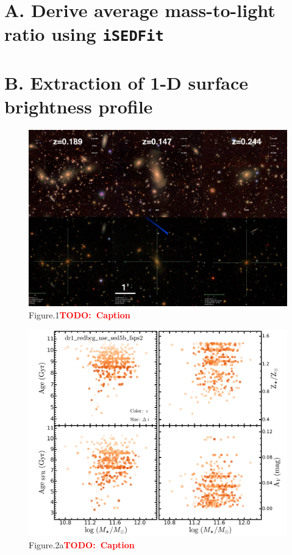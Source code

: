 \documentclass[preprint]{aastex}
\newcommand{\todo}[1]{\textcolor{red}{\textbf{TODO:~#1}}}
\begin{document}
\begin{CJK*}{UTF8}{gbsn}




\appendix

\section{A. Derive average mass-to-light ratio using \texttt{iSEDFit}} 

\section{B. Extraction of 1-D surface brightness profile} 



\clearpage
{}
\begin{figure}
    \centering 
    \includegraphics[width=15.5cm]{fig/fig1.png}
    \caption{Figure.1\todo{Caption}}\label{figure:1}
\end{figure}

\clearpage
{}
\begin{figure}
    \centering 
    \includegraphics[width=11.5cm]{fig/dr1_redbcg_use_sed5b_fsps2_logm_plots}
    \caption{Figure.2a\todo{Caption}}\label{figure:2a}
\end{figure}


\end{CJK*}
\end{document}
